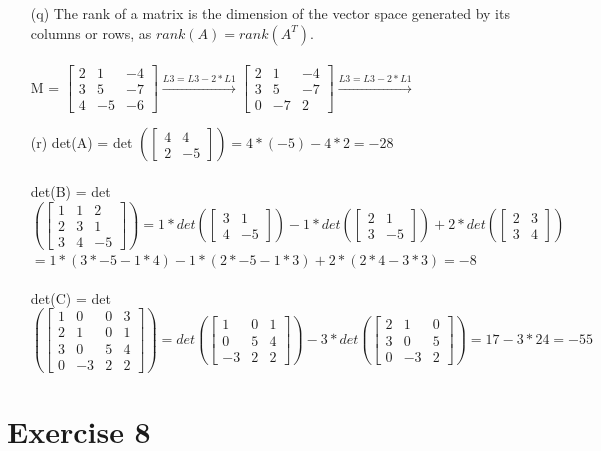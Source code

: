 \documentclass[a4paper]{article}
\begin{document}
\begin{itemize}
\item[(q)] The rank of a matrix is the dimension of the vector space generated by its columns or rows, as $rank(A)=rank(A^{T})$.\\\\
M = 
$
\begin{bmatrix} 
2 & 1 & -4\\
3 & 5 & -7\\
4 & -5 & -6
\end{bmatrix}
\xrightarrow{L3 = L3 - 2*L1}
\begin{bmatrix} 
2 & 1 & -4\\
3 & 5 & -7\\
0 & -7 & 2
\end{bmatrix}
\xrightarrow{L3 = L3 - 2*L1}
$

\item[(r)] det(A) = det
$
(
\begin{bmatrix} 
4 & 4\\
2 & -5 
\end{bmatrix}
) = 4*(-5) - 4*2 = -28
$\\\\
det(B) = det
$
(
\begin{bmatrix} 
1 & 1 & 2\\
2 & 3 & 1\\
3 & 4 & -5
\end{bmatrix}
) = 
1 * det(
\begin{bmatrix} 
3 & 1\\
4 & -5 
\end{bmatrix}
)
-1* det(
\begin{bmatrix} 
2 & 1\\
3 & -5 
\end{bmatrix}
) + 
2 * det(
\begin{bmatrix} 
2 & 3\\
3 & 4 
\end{bmatrix}
)
$\\
$=
1 *(3 * −5 − 1 * 4) − 1 *(2 * −5 − 1 * 3) + 2 * (2 * 4 − 3 * 3) = -8
$\\\\
det(C) = det
$
(
\begin{bmatrix} 
1 & 0 & 0 & 3\\
2 & 1 & 0 & 1\\
3 & 0 & 5 & 4\\
0 & -3 & 2 & 2
\end{bmatrix}
)
= 
det(
\begin{bmatrix} 
1 & 0 & 1\\
0 & 5 & 4\\
-3 & 2 & 2
\end{bmatrix}
)
-3 * det(
\begin{bmatrix} 
2 & 1 & 0 \\
3 & 0 & 5 \\
0 & -3 & 2
\end{bmatrix}
) = 17 - 3* 24 = -55
$
\end{itemize}

\section*{Exercise 8}
\end{document}
